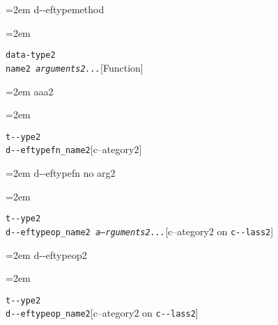\documentclass{book}
\begin{document}
%
\par\begingroup\obeylines\obeyspaces\frenchspacing\leftskip=2em\relax\parskip=0pt\relax\ttfamily{}%
d{-}{-}eftypemethod
\endgroup{}%
\par\begingroup\obeylines\obeyspaces\frenchspacing\leftskip=2em\relax\parskip=0pt\relax\ttfamily{}%


\endgroup{}%
\noindent\texttt{data-type2\leavevmode{}\\name2 \bgroup{}\normalfont{}\textsl{arguments2...}\egroup{}}\hfill[Function]



%
\par\begingroup\obeylines\obeyspaces\frenchspacing\leftskip=2em\relax\parskip=0pt\relax\ttfamily{}%
aaa2
\endgroup{}%
\par\begingroup\obeylines\obeyspaces\frenchspacing\leftskip=2em\relax\parskip=0pt\relax\ttfamily{}%

\endgroup{}%
\noindent\texttt{t{-}{-}ype2\leavevmode{}\\d{-}{-}eftypefn\_name2}\hfill[c--ategory2]



%
\par\begingroup\obeylines\obeyspaces\frenchspacing\leftskip=2em\relax\parskip=0pt\relax\ttfamily{}%
d{-}{-}eftypefn no arg2
\endgroup{}%
\par\begingroup\obeylines\obeyspaces\frenchspacing\leftskip=2em\relax\parskip=0pt\relax\ttfamily{}%

\endgroup{}%
\noindent\texttt{t{-}{-}ype2\leavevmode{}\\d{-}{-}eftypeop\_name2 \bgroup{}\normalfont{}\textsl{a--rguments2...}\egroup{}}\hfill[c--ategory2 on \texttt{c{-}{-}lass2}]



%
\par\begingroup\obeylines\obeyspaces\frenchspacing\leftskip=2em\relax\parskip=0pt\relax\ttfamily{}%
d{-}{-}eftypeop2
\endgroup{}%
\par\begingroup\obeylines\obeyspaces\frenchspacing\leftskip=2em\relax\parskip=0pt\relax\ttfamily{}%

\endgroup{}%
\noindent\texttt{t{-}{-}ype2\leavevmode{}\\d{-}{-}eftypeop\_name2}\hfill[c--ategory2 on \texttt{c{-}{-}lass2}]
\end{document}
